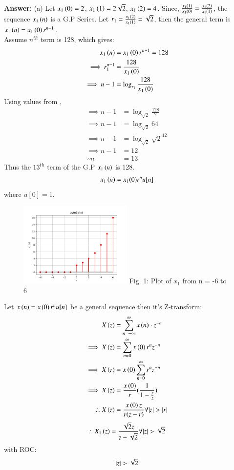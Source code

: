 \documentclass[journal,12pt,twocolumn]{IEEEtran}
\theoremstyle{remark}
\begin{document}
\textbf{Answer:} (a) Let $x_1\left(0\right) = 2$, $x_1\left(1\right) = 2\sqrt{2}$, $x_1\left(2\right) = 4$.
Since, $\frac{x_1\left(1\right)}{x_1\left(0\right)} = \frac{x_1\left(2\right)}{x_1\left(1\right)}$, the sequence $x_1\left(n\right)$ is a G.P Series.
Let $r_1 = \frac{x_1\left(2\right)}{x_1\left(1\right)} = \sqrt{2}$, then the general term is $x_1\left(n\right) = x_1\left(0\right) r^{n-1}$.\\
Assume $n^{th}$ term is 128, which gives: 
\begin{align}
    x_1\left(n\right) &= x_1\left(0\right) r^{n-1} = 128\\
    \implies r_1^{n-1} &= \frac{128}{x_1\left(0\right)}\\
    \implies n - 1 &= \log_{r_1}{\frac{128}{x_1\left(0\right)}}
\end{align}
Using values from , 
\begin{align}
    \implies n - 1 &= \log_{\sqrt{2}}{\frac{128}{2}}\\
    \implies n - 1 &= \log_{\sqrt{2}}{64}\\
    \implies n - 1 &= \log_{\sqrt{2}}{\sqrt{2}^{12}}\\
    \implies n - 1 &= 12\\
    \therefore n &= 13
\end{align}
Thus the $13^{th}$ term of the G.P $x_1\left(n\right)$ is 128.\\ 
\begin{align} x_1\left(n\right) = x_1(0)r^{n}u[n] \end{align} where $u[0] = 1$.
\begin{figure}[h!]
    \centering
    \includegraphics[width=0.5\textwidth]{figs/a.png}
    Fig. 1: Plot of $x_1$ from n = -6 to 6
    \label{fig:img1}
\end{figure}


Let $x\left(n\right) = x\left(0\right)r^nu[n]$ be a general sequence then it's Z-transform:
\begin{align}
    X\left(z\right) &= \sum_{n = -\infty}^{\infty}{x\left(n\right) \cdot z^{-n}}\\
    \implies X\left(z\right) &= \sum_{n = 0}^{\infty}{x\left(0\right)r^{n}z^{-n}}\\
    \implies X\left(z\right) &= x\left(0\right)\sum_{n = 0}^{\infty}{r^n z^{-n}}\\
    \implies X\left(z\right) &= \frac{x\left(0\right)}{r}(\frac{1}{1 - \frac{r}{z}})\\
    \therefore X\left(z\right) &= \frac{x\left(0\right)z}{r(z - r)} \forall {\left\vert z\right\vert > \left\vert r\right\vert} \label{zresult}
\end{align}
\begin{align}
    \therefore X_1\left(z\right) = \frac{\sqrt{2}z}{z - \sqrt{2}}\forall {\left\vert z\right\vert > \sqrt{2}}
\end{align}
with ROC: \[ \left\vert z\right\vert > \sqrt{2} \]
\end{document}
